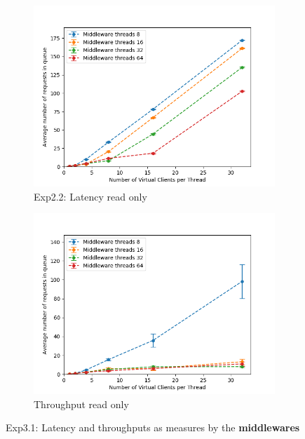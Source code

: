 \documentclass[11pt,a4paper]{article}
\begin{document}
\begin{figure}[H]
\centering
\begin{subfigure}{.5\textwidth}
    \centering
    \includegraphics[width=\textwidth]{img/exp3_1/exp3_1__queuesize_middleware_write_0.png}
    \caption{Exp2.2: Latency read only}
    \label{fig:mesh1}
\end{subfigure}%
\begin{subfigure}{.5\textwidth}
      \centering
    \includegraphics[width=\textwidth]{img/exp3_1/exp3_1__queuesize_middleware_write_1.png}
    \caption{Throughput read only}
    \label{fig:mesh1}
\end{subfigure}
\caption{Exp3.1: Latency and throughputs as measures by the \textbf{middlewares}}
\label{fig:test}
\end{figure}
\end{document}
